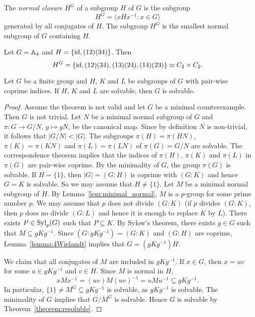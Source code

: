 The 
{\em normal closure} $H^G$ of a subgroup $H$ of $G$ is the subgroup
\[
	H^G=\langle xHx^{-1}:x\in G\rangle
\]
generated by all conjugates of $H$. The 
subgroup $H^G$ is the smallest normal subgroup of $G$ containing $H$. 

\begin{example}
	Let $G=\mathbb{A}_4$ and $H=\{\operatorname{id},(12)(34)\}$. Then 
	\[
	H^G=\{\operatorname{id},(12)(34),(13)(24),(14)(23)\}\simeq C_2\times C_2.
	\]
\end{example}


\begin{theorem}[Wielandt]
	\label{theorem:Wielandt:solvable}
	Let $G$ be a finite group and $H$, $K$ and $L$ be subgroups of $G$ 
	with pair-wise coprime indices. If $H$, $K$ and $L$ are solvable, 
	then $G$ is solvable. 
\end{theorem}

\begin{proof}
	Assume the theorem is not valid and let $G$ be a minimal counterexample. 
	Then $G$ is not trivial.  
	Let $N$ be a minimal normal subgroup of 
	$G$ and $\pi\colon G\to G/N$, $g\mapsto gN$, be the canonical map. Since 
	by definition $N$ is non-trivial, 
	it follows that $|G/N|<|G|$. 
	The subgroups 
	$\pi(H)=\pi(HN)$, $\pi(K)=\pi(KN)$ and $\pi(L)=\pi(LN)$ of $\pi(G)=G/N$ are solvable. 
	The correspondence theorem implies that 
	the indices of $\pi(H)$, $\pi(K)$ and $\pi(L)$ in $\pi(G)$ are pair-wise coprime. By the 
	minimality of $G$, the group 
	$\pi(G)$ is solvable. If $H=\{1\}$, then 
	$|G|=(G:H)$ is coprime with $(G:K)$ and hence $G=K$ is solvable. So we may assume that  
	$H\ne \{1\}$. Let $M$ be a minimal normal subgroup of $H$. By
	Lemma~\ref{lem:minimal_normal}, $M$ is a $p$-group for some prime number $p$. We may
	assume that $p$ does not divide 
	$(G:K)$ (if $p$ divides $(G:K)$, then $p$ does no divide $(G:L)$ and 
	hence it is enough to replace $K$ by $L$). There exists 
	$P\in\mathrm{Syl}_p(G)$ such that $P\subseteq K$. By Sylow's theorem, 
	there exists  $g\in G$ such that $M\subseteq
	gKg^{-1}$. Since $(G:gKg^{-1})=(G:K)$ and $(G:H)$ are coprime, 
	Lemma~\ref{lemma:4Wielandt} implies that $G=(gKg^{-1})H$. 
	
	We claim that all  conjugates of $M$ are included in $gKg^{-1}$. 
	If $x\in G$, then $x=uv$ for some $u\in 
	gKg^{-1}$ and $v\in H$. Since $M$ is normal in $H$, 
	\[
	xMx^{-1}=(uv)M(uv)^{-1}=uMu^{-1}\subseteq gKg^{-1}.
	\]
	In particular, $\{1\}\ne M^G\subseteq gKg^{-1}$ is solvable, as $gKg^{-1}$ is
	solvable. The minimality of $G$ implies that $G/M^G$ is solvable. Hence 
	$G$ is solvable by Theorem~\ref{theorem:resoluble}.
\end{proof}



